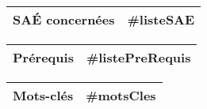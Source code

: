 \begin{tabular}[t]{|P|T|}
\hline
    \textcolor{ressourceC}{\bfseries SAÉ concernées }
    &
    #listeSAE %
    \\
\hline
\end{tabular}

\begin{tabular}[t]{|P|T|}
\hline
    \textcolor{ressourceC}{\bfseries Prérequis}
    &
    #listePreRequis %
    \\
\hline
\end{tabular}

\begin{tabular}[t]{|P|T|}
\hline
    \textcolor{ressourceC}{\bfseries Mots-clés}
    &
    #motsCles %
    \\
\hline

\end{tabular}
